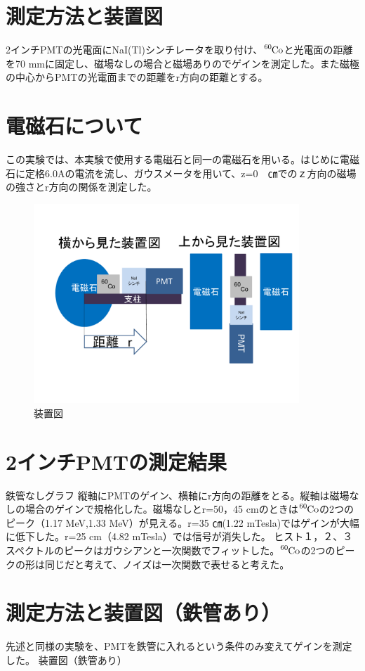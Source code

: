 \section{測定方法と装置図}
2インチPMTの光電面にNaI(Tl)シンチレータを取り付け、$\ce{^{60}Co}$と光電面の距離を70 mmに固定し、磁場なしの場合と磁場ありのでゲインを測定した。また磁極の中心からPMTの光電面までの距離をr方向の距離とする。
\section{電磁石について}
この実験では、本実験で使用する電磁石と同一の電磁石を用いる。はじめに電磁石に定格6.0Aの電流を流し、ガウスメータを用いて、z=0　㎝でのｚ方向の磁場の強さとr方向の関係を測定した。
\begin{figure}[H]
	\centering
		\includegraphics[width=10cm]{fig/iguchi/soutizu1.pdf}
	\caption{装置図}
	\label{soutizu1}
\end{figure}

\section{2インチPMTの測定結果}
鉄管なしグラフ
縦軸にPMTのゲイン、横軸にr方向の距離をとる。縦軸は磁場なしの場合のゲインで規格化した。磁場なしとr=50，45 cmのときは$\ce{^{60}Co}$の2つのピーク（1.17 MeV,1.33 MeV）が見える。r=35 ㎝(1.22 mTesla)ではゲインが大幅に低下した。r=25 cm（4.82 mTesla）では信号が消失した。
ヒスト１，２、３
スペクトルのピークはガウシアンと一次関数でフィットした。$\ce{^{60}Co}$の2つのピークの形は同じだと考えて、ノイズは一次関数で表せると考えた。
\section{測定方法と装置図（鉄管あり）}
先述と同様の実験を、PMTを鉄管に入れるという条件のみ変えてゲインを測定した。
装置図（鉄管あり）

